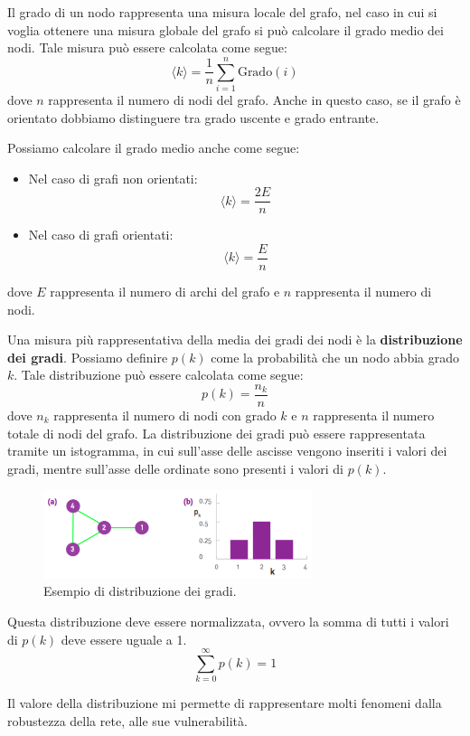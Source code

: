 Il grado di un nodo rappresenta una misura locale del grafo, nel caso in cui
si voglia ottenere una misura globale del grafo si può calcolare il grado
medio dei nodi. Tale misura può essere calcolata come segue:
\begin{equation}
    \langle k \rangle = \frac{1}{n} \sum_{i=1}^{n} \text{Grado}(i)
\end{equation}
dove $n$ rappresenta il numero di nodi del grafo. Anche in questo caso, se il
grafo è orientato dobbiamo distinguere tra grado uscente e grado entrante.
\begin{nota}
    Possiamo calcolare il grado medio anche come segue:
    \begin{itemize}
        \item Nel caso di grafi non orientati:
              \begin{equation}
                  \langle k \rangle = \frac{2E}{n}
              \end{equation}
        \item Nel caso di grafi orientati:
              \begin{equation}
                  \langle k \rangle = \frac{E}{n}
              \end{equation}
    \end{itemize}
    dove $E$ rappresenta il numero di archi del grafo e $n$ rappresenta il
    numero di nodi.
\end{nota}
Una misura più rappresentativa della media dei gradi dei nodi è la \textbf{distribuzione
    dei gradi}. Possiamo definire $p(k)$ come la probabilità che un nodo abbia
grado $k$. Tale distribuzione può essere calcolata come segue:
\begin{equation}
    p(k) = \frac{n_k}{n}
\end{equation}
dove $n_k$ rappresenta il numero di nodi con grado $k$ e $n$ rappresenta il
numero totale di nodi del grafo. La distribuzione dei gradi può essere
rappresentata tramite un istogramma, in cui sull'asse delle ascisse vengono
inseriti i valori dei gradi, mentre sull'asse delle ordinate sono presenti i
valori di $p(k)$.
\begin{figure}[!ht]
    \centering
    \includegraphics[width=0.7\textwidth]{./img/net/degreedist.png}
    \caption{Esempio di distribuzione dei gradi.}
    \label{fig:degree_distribution}
\end{figure}
\begin{nota}
    Questa distribuzione deve essere normalizzata, ovvero la somma di tutti i
    valori di $p(k)$ deve essere uguale a 1.
    \begin{equation*}
        \sum_{k=0}^{\infty} p(k) = 1
    \end{equation*}
\end{nota}
Il valore della distribuzione mi permette di rappresentare molti fenomeni dalla
robustezza della rete, alle sue vulnerabilità.
